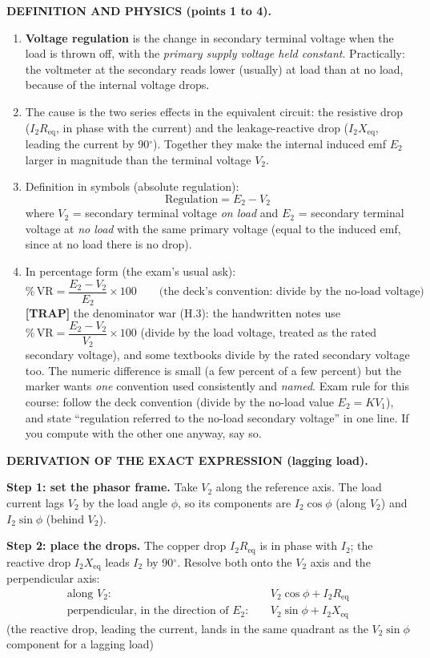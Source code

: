 \documentclass[11pt]{article}
\newcommand{\tagline}[1]{\textbf{\color{copper}#1}}
\newcommand{\trap}[1]{\vspace{2pt}\textbf{\color{red}[TRAP]} #1}
\begin{document}
\tagline{DEFINITION AND PHYSICS (points 1 to 4).}
\begin{enumerate}[label=\arabic*.]
\item \textbf{Voltage regulation} is the change in secondary terminal voltage when the load is thrown off, with the \emph{primary supply voltage held constant}. Practically: the voltmeter at the secondary reads lower (usually) at load than at no load, because of the internal voltage drops.
\item The cause is the two series effects in the equivalent circuit: the resistive drop ($I_2 R_{\text{eq}}$, in phase with the current) and the leakage-reactive drop ($I_2 X_{\text{eq}}$, leading the current by 90$^\circ$). Together they make the internal induced emf $E_2$ larger in magnitude than the terminal voltage $V_2$.
\item Definition in symbols (absolute regulation):
\[
\text{Regulation} = E_2 - V_2
\]
where $V_2$ = secondary terminal voltage \emph{on load} and $E_2$ = secondary terminal voltage at \emph{no load} with the same primary voltage (equal to the induced emf, since at no load there is no drop).
\item In percentage form (the exam's usual ask):
\[
\%\,\text{VR} = \frac{E_2 - V_2}{E_2} \times 100
\qquad\text{(the deck's convention: divide by the no-load voltage)}
\]
\trap{the denominator war (H.3): the handwritten notes use $\%\,\text{VR} = \dfrac{E_2 - V_2}{V_2} \times 100$ (divide by the load voltage, treated as the rated secondary voltage), and some textbooks divide by the rated secondary voltage too. The numeric difference is small (a few percent of a few percent) but the marker wants \emph{one} convention used consistently and \emph{named}. Exam rule for this course: follow the deck convention (divide by the no-load value $E_2 = K V_1$), and state ``regulation referred to the no-load secondary voltage'' in one line. If you compute with the other one anyway, say so.}
\end{enumerate}

\tagline{DERIVATION OF THE EXACT EXPRESSION (lagging load).}

\textbf{Step 1: set the phasor frame.} Take $V_2$ along the reference axis. The load current lags $V_2$ by the load angle $\phi$, so its components are $I_2\cos\phi$ (along $V_2$) and $I_2\sin\phi$ (behind $V_2$).

\textbf{Step 2: place the drops.} The copper drop $I_2 R_{\text{eq}}$ is in phase with $I_2$; the reactive drop $I_2 X_{\text{eq}}$ leads $I_2$ by 90$^\circ$. Resolve both onto the $V_2$ axis and the perpendicular axis:
\begin{align*}
\text{along } V_2:&\quad V_2\cos\phi + I_2 R_{\text{eq}} \\
\text{perpendicular, in the direction of } E_2:&\quad V_2\sin\phi + I_2 X_{\text{eq}}
\end{align*}
(the reactive drop, leading the current, lands in the same quadrant as the $V_2\sin\phi$ component for a lagging load)
\end{document}
